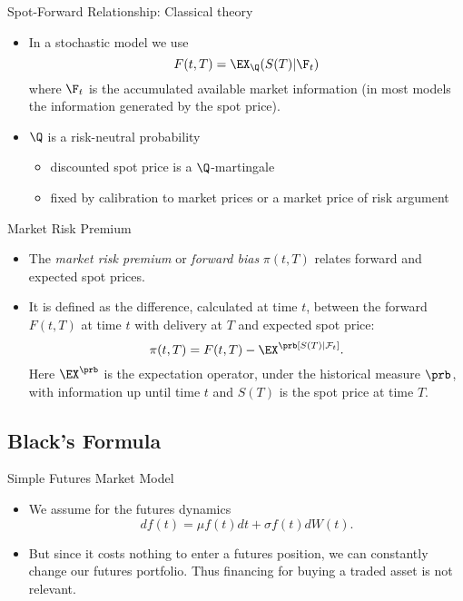 {Spot-Forward Relationship: Classical theory}
\begin{itemize}
\item<1-> In a stochastic model we use
$$
F(t,T)=\EX_{\Q}(S(T)|\F_t)
$$
where $\F_t$ is the accumulated available market information (in most models the information generated by the spot price).
\item<2-> $\Q$ is a risk-neutral probability
\begin{itemize}
\item discounted spot price is a $\Q$-martingale
\item fixed by calibration to market prices or a market price of risk argument
\end{itemize}
\end{itemize}



{Market Risk Premium}
\begin{itemize}
\item<1-> The \emph{market risk premium} or \emph{forward bias} $\pi (t,T)$
relates forward and expected spot prices.
\item<2-> It is defined as the difference, calculated at time $t$, between
the forward $F(t,T)$ at time $t$ with delivery at $T$ and expected
spot price:
\begin{equation}\label{forward risk premium}
\pi(t,T)= F(t,T)-\EX^\prb[S(T)|\mathcal F_t].
\end{equation}
Here $\EX^\prb$ is the expectation operator, under the
historical measure $\prb$, with information up until time $t$ and
$S(T)$ is the spot price at time $T$.
\end{itemize}



\subsection{Black's Formula}

{Simple Futures Market Model}
\begin{itemize}
\item<1-> We assume for the futures dynamics
$$
df(t) = \mu f(t) dt + \sigma f(t) dW(t).
$$
\item<2-> But since it costs nothing to enter a futures position, we can constantly change our futures portfolio.
Thus financing for buying a traded asset is not relevant.
\end{itemize}



